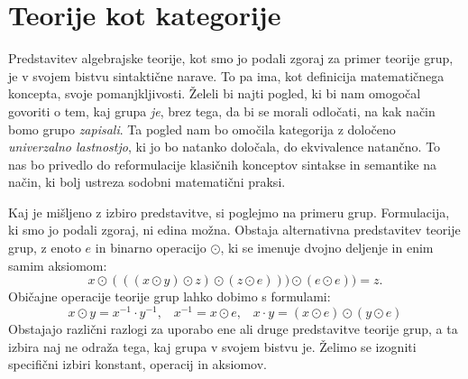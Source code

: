 \documentclass[../kategoricna_logika.tex]{subfiles}
\begin{document}
\section{Teorije kot kategorije}
\label{sec:teorije-kot-kategorije}
Predstavitev algebrajske teorije, kot smo jo podali zgoraj za primer
teorije grup, je v svojem bistvu sintaktične narave. To pa ima,
kot definicija matematičnega koncepta, svoje pomanjkljivosti.
Želeli bi najti pogled, ki bi nam omogočal govoriti o tem,
kaj grupa \emph{je}, brez tega, da bi se morali odločati,
na kak način bomo grupo \emph{zapisali}.
Ta pogled nam bo omočila kategorija z določeno \emph{univerzalno lastnostjo},
ki jo bo natanko določala, do ekvivalence natančno.
To nas bo privedlo do reformulacije klasičnih konceptov
sintakse in semantike na način, ki bolj ustreza sodobni matematični praksi.

Kaj je mišljeno z izbiro predstavitve, si poglejmo na primeru grup.
Formulacija, ki smo jo podali zgoraj, ni edina možna.
Obstaja alternativna predstavitev teorije grup,
z enoto $e$ in binarno operacijo $\odot$,
ki se imenuje dvojno deljenje in enim samim aksiomom:
$$x \odot (((x \odot y ) \odot z ) \odot ( z \odot e))) \odot (e \odot e) ) = z.$$
Običajne operacije teorije grup lahko dobimo s formulami:
$$x \odot y = x^{-1} \cdot y^{-1} \text{,} \quad x^{-1} = x \odot e \text{,} \quad x \cdot y = (x \odot e) \odot (y \odot e)$$
%
Obstajajo različni razlogi za uporabo ene ali druge predstavitve
teorije grup, a ta izbira naj ne odraža tega, kaj grupa v svojem bistvu je.
Želimo se izogniti specifični izbiri konstant, operacij in aksiomov.
\end{document}
